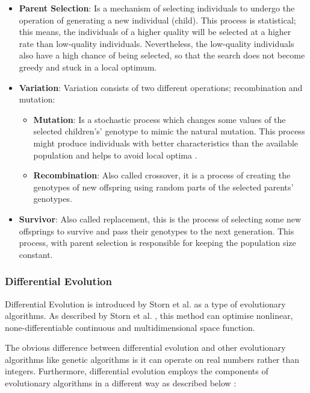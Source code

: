 \begin{itemize}
	\item \textbf{Parent Selection}: Is a mechanism of selecting individuals to undergo the operation of generating a new individual (child). This process is statistical; this means, the individuals of a higher quality will be selected at a higher rate than low-quality individuals. Nevertheless, the low-quality individuals also have a high chance of being selected, so that the search does not become greedy and stuck in a local optimum.
	\item \textbf{Variation}: Variation consists of two different operations; recombination and mutation:
	\begin{itemize}
		\item \textbf{Mutation}: Is a stochastic process which changes some values of the selected children's' genotype to mimic the natural mutation. This process might produce individuals with better characteristics than the available population and helps to avoid local optima \cite{Grefenstette1986}.
		\item \textbf{Recombination}: Also called crossover, it is a process of creating the genotypes of new offspring using random parts of the selected parents' genotypes.
	\end{itemize}
	\item \textbf{Survivor}: Also called replacement, this is the process of selecting some new offsprings to survive and pass their genotypes to the next generation. This process, with parent selection is responsible for keeping the population size constant.
\end{itemize}



\subsubsection{Differential Evolution}

Differential Evolution is introduced by Storn et al. \cite{Storn1997} as a type of evolutionary algorithms. As described by Storn et al. \cite{Storn1997}, this method can optimise nonlinear, none-differentiable continuous and multidimensional space function.

The obvious difference between differential evolution and other evolutionary algorithms like genetic algorithms is it can operate on real numbers rather than integers. Furthermore, differential evolution employs the components of evolutionary algorithms in a different way as described below \cite{Storn1997}:

